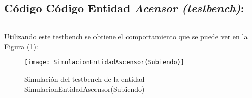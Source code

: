 \subsection{Código Código Entidad \textit{Acensor (testbench)}:} \label{code:Acensor_tb}
\inputminted[frame=lines,fontsize=\footnotesize,linenos]{vhdl}{CodeFiles/EntidadAscensor_tb.vhd}

    Utilizando este testbench se obtiene el comportamiento que se puede ver en la Figura (\ref{fig:SimulacionEntidadAscensor}):

    \begin{figure}[H]
		    \centering
		    \texttt{[image: SimulacionEntidadAscensor(Subiendo)]}
		    \caption{Simulación del testbench de la entidad SimulacionEntidadAscensor(Subiendo)}
		    \label{fig:SimulacionEntidadAscensor}
	\end{figure}
